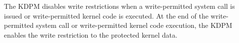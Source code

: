 The KDPM disables write restrictions when a write-permitted system
call is issued or write-permitted kernel code is executed.
%
At the end of the write-permitted system call or write-permitted kernel code
execution, the KDPM enables the write restriction to the protected kernel data.












